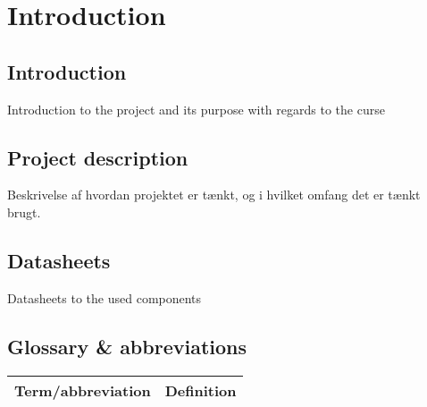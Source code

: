 \chapter{Introduction}

\section{Introduction}
Introduction to the project and its purpose with regards to the curse

\section{Project description}
Beskrivelse af hvordan projektet er tænkt, og i hvilket omfang det er tænkt brugt.

\section{Datasheets}
Datasheets to the used components

\section{Glossary \& abbreviations}
\begin{table}[H]
\centering
\begin{tabular}{|p{4cm}|p{7cm}|}
\hline
Term/abbreviation & Definition\\ \hline
\end{tabular}
\end{table}

